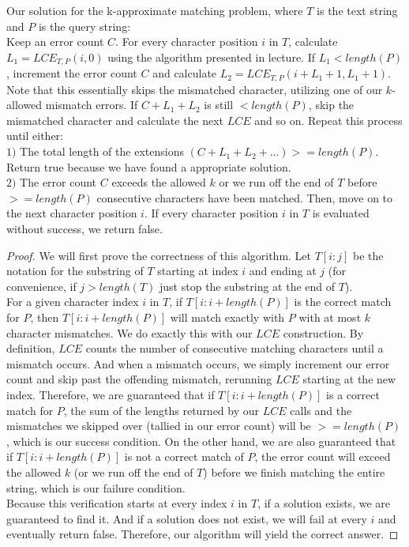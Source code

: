 \documentclass{article}
\theoremstyle{casestyle}
\begin{document}
Our solution for the k-approximate matching problem, where $T$ is the text string and $P$ is the query string:\\

Keep an error count $C$. For every character position $i$ in $T$, calculate $L_1 = LCE_{T, P}(i, 0)$ using the algorithm presented in lecture. If $L_1 < length(P)$, increment the error count $C$ and calculate $L_2 = LCE_{T, P}(i + L_1 + 1, L_1 + 1)$. Note that this essentially skips the mismatched character, utilizing one of our $k$-allowed mismatch errors. If $C + L_1 + L_2$ is still $< length(P)$, skip the mismatched character and calculate the next $LCE$ and so on. Repeat this process until either:\\
$1)$ The total length of the extensions $(C + L_1 + L_2 + ...) >= length(P)$. Return true because we have found a appropriate solution.\\
$2)$ The error count $C$ exceeds the allowed $k$ or we run off the end of $T$ before $>= length(P)$ consecutive characters have been matched. Then, move on to the next character position $i$. If every character position $i$ in $T$ is evaluated without success, we return false.\\

\begin{proof} 
We will first prove the correctness of this algorithm. Let $T[i:j]$ be the notation for the substring of $T$ starting at index $i$ and ending at $j$ (for convenience, if $j > length(T)$ just stop the substring at the end of $T$).\\

For a given character index $i$ in $T$, if $T[i:i+length(P)]$ is the correct match for $P$, then $T[i:i+length(P)]$ will match exactly with $P$ with at most $k$ character mismatches. We do exactly this with our $LCE$ construction. By definition, $LCE$ counts the number of consecutive matching characters until a mismatch occurs. And when a mismatch occurs, we simply increment our error count and skip past the offending mismatch, rerunning $LCE$ starting at the new index. Therefore, we are guaranteed that if $T[i:i+length(P)]$ is a correct match for $P$, the sum of the lengths returned by our $LCE$ calls and the mismatches we skipped over (tallied in our error count) will be $>= length(P)$, which is our success condition. On the other hand, we are also guaranteed that if $T[i:i+length(P)]$ is not a correct match of $P$, the error count will exceed the allowed $k$ (or we run off the end of $T$) before we finish matching the entire string, which is our failure condition.\\

Because this verification starts at every index $i$ in $T$, if a solution exists, we are guaranteed to find it. And if a solution does not exist, we will fail at every $i$ and eventually return false. Therefore, our algorithm will yield the correct answer.
\end{proof}
\end{document}
